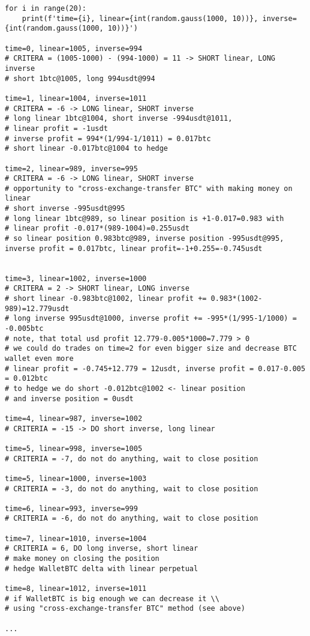 \documentclass{article}
\begin{document}
\begin{lstlisting}
for i in range(20):
    print(f'time={i}, linear={int(random.gauss(1000, 10))}, inverse={int(random.gauss(1000, 10))}')

time=0, linear=1005, inverse=994
# CRITERA = (1005-1000) - (994-1000) = 11 -> SHORT linear, LONG inverse
# short 1btc@1005, long 994usdt@994

time=1, linear=1004, inverse=1011
# CRITERA = -6 -> LONG linear, SHORT inverse
# long linear 1btc@1004, short inverse -994usdt@1011,  
# linear profit = -1usdt
# inverse profit = 994*(1/994-1/1011) = 0.017btc
# short linear -0.017btc@1004 to hedge

time=2, linear=989, inverse=995
# CRITERA = -6 -> LONG linear, SHORT inverse
# opportunity to "cross-exchange-transfer BTC" with making money on linear
# short inverse -995usdt@995
# long linear 1btc@989, so linear position is +1-0.017=0.983 with 
# linear profit -0.017*(989-1004)=0.255usdt
# so linear position 0.983btc@989, inverse position -995usdt@995, inverse profit = 0.017btc, linear profit=-1+0.255=-0.745usdt


time=3, linear=1002, inverse=1000
# CRITERA = 2 -> SHORT linear, LONG inverse
# short linear -0.983btc@1002, linear profit += 0.983*(1002-989)=12.779usdt
# long inverse 995usdt@1000, inverse profit += -995*(1/995-1/1000) = -0.005btc
# note, that total usd profit 12.779-0.005*1000=7.779 > 0
# we could do trades on time=2 for even bigger size and decrease BTC wallet even more
# linear profit = -0.745+12.779 = 12usdt, inverse profit = 0.017-0.005 = 0.012btc
# to hedge we do short -0.012btc@1002 <- linear position
# and inverse position = 0usdt

time=4, linear=987, inverse=1002
# CRITERIA = -15 -> DO short inverse, long linear

time=5, linear=998, inverse=1005
# CRITERIA = -7, do not do anything, wait to close position

time=5, linear=1000, inverse=1003
# CRITERIA = -3, do not do anything, wait to close position

time=6, linear=993, inverse=999
# CRITERIA = -6, do not do anything, wait to close position

time=7, linear=1010, inverse=1004
# CRITERIA = 6, DO long inverse, short linear
# make money on closing the position
# hedge WalletBTC delta with linear perpetual

time=8, linear=1012, inverse=1011
# if WalletBTC is big enough we can decrease it \\
# using "cross-exchange-transfer BTC" method (see above)

...
\end{lstlisting}
\end{document}
